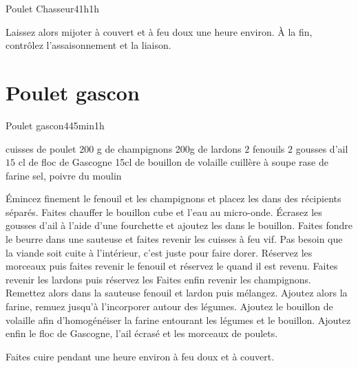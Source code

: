 {\begin{recette}{Poulet Chasseur}{4}{1h}{1h}
\begin{cuisson}
Laissez alors mijoter à couvert et à feu doux une heure environ. À la fin, contrôlez l'assaisonnement et la liaison.
\end{cuisson}
\end{recette}

\section{Poulet gascon}
\begin{recette}{Poulet gascon}{4}{45min}{1h}

\begin{ingredients}
 cuisses de poulet
\ingredient $200$ g de champignons
\ingredient 200g de lardons
\ingredient $2$ fenouils
\ingredient $2$ gousses d'ail
\ingredient $15$ cl de floc de Gascogne
\ingredient 15cl de bouillon de volaille
 cuillère à soupe rase de farine
\ingredient sel, poivre du moulin
\end{ingredients}

\begin{preparation}
\etape Émincez finement le fenouil et les champignons et placez les dans des récipients séparés.
\etape Faites chauffer le bouillon cube et l'eau au micro-onde. Écrasez les gousses d'ail à l'aide d'une fourchette et ajoutez 
les dans le bouillon.
\etape Faites fondre le beurre dans une sauteuse et faites revenir les cuisses à feu vif. Pas besoin que la viande soit cuite à 
l'intérieur, c'est juste pour faire dorer.
\etape Réservez les morceaux puis faites revenir le fenouil et réservez le quand il est revenu.
\etape Faites revenir les lardons puis réservez les
\etape Faites enfin revenir les champignons.
\etape Remettez alors dans la sauteuse fenouil et lardon puis mélangez.
\etape Ajoutez alors la farine, remuez jusqu'à l'incorporer autour des légumes.
\etape Ajoutez le bouillon de volaille afin d'homogénéiser la farine entourant les légumes et le bouillon.
\etape Ajoutez enfin le floc de Gascogne, l'ail écrasé et les morceaux de poulets.
\end{preparation}

\begin{cuisson}
Faites cuire pendant une heure environ à feu doux et à couvert.
\end{cuisson}
\end{recette}

}
